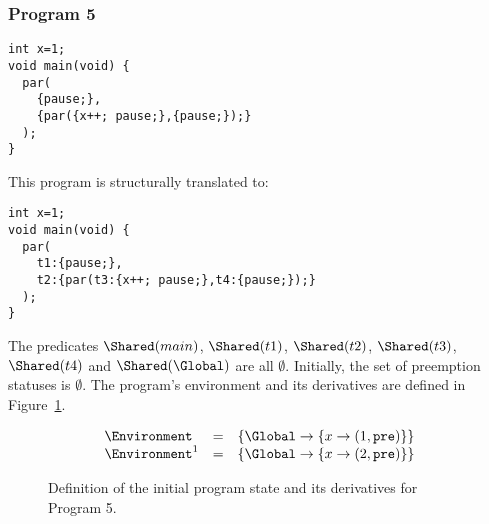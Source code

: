 \subsubsection{Program 5}
\begin{lstlisting}[style=snippet]
int x=1;
void main(void) {
  par(
    {pause;}, 
    {par({x++; pause;},{pause;});}
  );
}
\end{lstlisting}
This program is structurally translated to:
\begin{lstlisting}[style=snippet]
int x=1;
void main(void) {
  par(
    t1:{pause;}, 
    t2:{par(t3:{x++; pause;},t4:{pause;});}
  );
}
\end{lstlisting}
The predicates $\Shared(main)$, $\Shared(t1)$, $\Shared(t2)$, $\Shared(t3)$,
$\Shared(t4)$ and $\Shared(\Global)$ are all $\emptyset$.
Initially, the set of preemption statuses \Abort{} is $\emptyset$.
The program's environment \Environment{} 
and its derivatives are defined in Figure~\ref{figure:forec_program_5}.
\newline

\begin{figure}
	\centering
	$$\begin{array}{l l l}
		\Environment		&=& \left \lbrace
									\Global \to \lbrace x \to (1, \mathtt{pre}) \rbrace
								\right \rbrace	\\
		\Environment^1		&=& \left \lbrace
									\Global \to \lbrace x \to (2, \mathtt{pre}) \rbrace
								\right \rbrace	\\
	\end{array}$$
	
	\caption{Definition of the initial program state and its derivatives for Program 5.}
	\label{figure:forec_program_5}
\end{figure}

